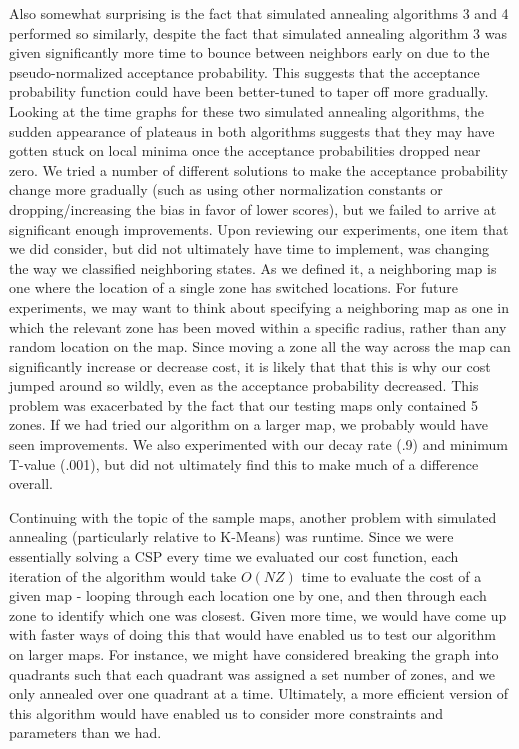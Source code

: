 \documentclass[11pt]{article}
\begin{document}
Also somewhat surprising is the fact that simulated annealing algorithms 3 and 4 performed so similarly, despite the fact that simulated annealing algorithm 3 was given significantly more time to bounce between neighbors early on due to the pseudo-normalized acceptance probability. This suggests that the acceptance probability function could have been better-tuned to taper off more gradually. Looking at the time graphs for these two simulated annealing algorithms, the sudden appearance of plateaus in both algorithms suggests that they may have gotten stuck on local minima once the acceptance probabilities dropped near zero. We tried a number of different solutions to make the acceptance probability change more gradually (such as using other normalization constants or dropping/increasing the bias in favor of lower scores), but we failed to arrive at significant enough improvements. Upon reviewing our experiments, one item that we did consider, but did not ultimately have time to implement, was changing the way we classified neighboring states. As we defined it, a neighboring map is one where the location of a single zone has switched locations. For future experiments, we may want to think about specifying a neighboring map as one in which the relevant zone has been moved within a specific radius, rather than any random location on the map. Since moving a zone all the way across the map can significantly increase or decrease cost, it is likely that that this is why our cost jumped around so wildly, even as the acceptance probability decreased. This problem was exacerbated by the fact that our testing maps only contained 5 zones. If we had tried our algorithm on a larger map, we probably would have seen improvements. We also experimented with our decay rate (.9) and minimum T-value (.001), but did not ultimately find this to make much of a difference overall.

Continuing with the topic of the sample maps, another problem with simulated annealing (particularly relative to K-Means) was runtime. Since we were essentially solving a CSP every time we evaluated our cost function, each iteration of the algorithm would take $O(NZ)$ time to evaluate the cost of a given map - looping through each location one by one, and then through each zone to identify which one was closest. Given more time, we would have come up with faster ways of doing this that would have enabled us to test our algorithm on larger maps. For instance, we might have considered breaking the graph into quadrants such that each quadrant was assigned a set number of zones, and we only annealed over one quadrant at a time. Ultimately, a more efficient version of this algorithm would have enabled us to consider more constraints and parameters than we had.
\end{document}
